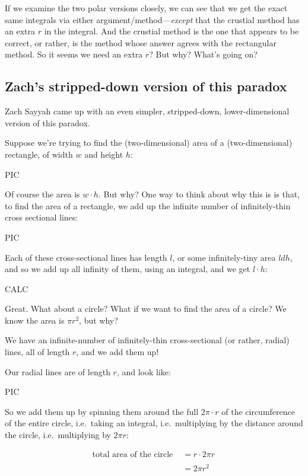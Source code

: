 \documentclass[
]{article}
\begin{document}
If we examine the two polar versions closely, we can see that we get the exact same integrals via either argument/method---\emph{except} that the crustial method has an extra \(r\) in the integral. And the crustial method is the one that appears to be correct, or rather, is the method whose answer agrees with the rectangular method. So it seems we need an extra \(r\)? But why? What's going on?

\hypertarget{zachs-stripped-down-version-of-this-paradox}{%
\subsection{Zach's stripped-down version of this paradox}\label{zachs-stripped-down-version-of-this-paradox}}

Zach Sayyah came up with an even simpler, stripped-down, lower-dimensional version of this paradox.

Suppose we're trying to find the (two-dimensional) area of a (two-dimensional) rectangle, of width \(w\) and height \(h\):

PIC

Of course the area is \(w\cdot h\). But why? One way to think about why this is is that, to find the area of a rectangle, we add up the infinite number of infinitely-thin cross sectional lines:

PIC

Each of these cross-sectional lines has length \(l\), or some infinitely-tiny area \(l dh\), and so we add up all infinity of them, using an integral, and we get \(l \cdot h\):

CALC

Great. What about a circle? What if we want to find the area of a circle? We know the area is \(\pi r^2\), but why?

We have an infinite-number of infinitely-thin cross-sectional (or rather, radial) lines, all of length \(r\), and we add them up!

Our radial lines are of length \(r\), and look like:

PIC

So we add them up by spinning them around the full \(2\pi\cdot r\) of the circumference of the entire circle, i.e.~taking an integral, i.e.~multiplying by the distance around the circle, i.e.~multiplying by \(2\pi r\):

\begin{align*}
\text{total area of the circle}\,\, &=  r\cdot 2\pi r\, \\ \\
&= 2\pi r^2
\end{align*}
\end{document}
